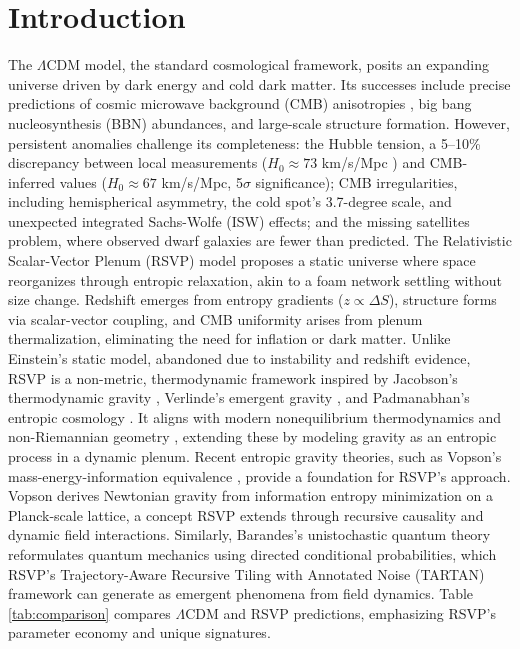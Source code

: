 \documentclass[11pt]{article}
\theoremstyle{plain}
\theoremstyle{definition}
\begin{document}
\section{Introduction}
The $\Lambda$CDM model, the standard cosmological framework, posits an expanding universe driven by dark energy and cold dark matter. Its successes include precise predictions of cosmic microwave background (CMB) anisotropies \citep{Planck2018}, big bang nucleosynthesis (BBN) abundances, and large-scale structure formation. However, persistent anomalies challenge its completeness: the Hubble tension, a 5--10\% discrepancy between local measurements ($H_0 \approx 73$ km/s/Mpc \citep{Riess2022}) and CMB-inferred values ($H_0 \approx 67$ km/s/Mpc, 5$\sigma$ significance); CMB irregularities, including hemispherical asymmetry, the cold spot's 3.7-degree scale, and unexpected integrated Sachs-Wolfe (ISW) effects; and the missing satellites problem, where observed dwarf galaxies are fewer than predicted.
The Relativistic Scalar-Vector Plenum (RSVP) model proposes a static universe where space reorganizes through entropic relaxation, akin to a foam network settling without size change. Redshift emerges from entropy gradients ($z \propto \Delta S$), structure forms via scalar-vector coupling, and CMB uniformity arises from plenum thermalization, eliminating the need for inflation or dark matter. Unlike Einstein's static model, abandoned due to instability and redshift evidence, RSVP is a non-metric, thermodynamic framework inspired by Jacobson's thermodynamic gravity \citep{Jacobson1995}, Verlinde's emergent gravity \citep{Verlinde2011}, and Padmanabhan's entropic cosmology \citep{Padmanabhan2015}. It aligns with modern nonequilibrium thermodynamics and non-Riemannian geometry \citep{Shao2023}, extending these by modeling gravity as an entropic process in a dynamic plenum.
Recent entropic gravity theories, such as Vopson's mass-energy-information equivalence \citep{Vopson2022}, provide a foundation for RSVP's approach. Vopson derives Newtonian gravity from information entropy minimization on a Planck-scale lattice, a concept RSVP extends through recursive causality and dynamic field interactions. Similarly, Barandes's unistochastic quantum theory \citep{Barandes2024} reformulates quantum mechanics using directed conditional probabilities, which RSVP's Trajectory-Aware Recursive Tiling with Annotated Noise (TARTAN) framework can generate as emergent phenomena from field dynamics.
Table \ref{tab:comparison} compares $\Lambda$CDM and RSVP predictions, emphasizing RSVP's parameter economy and unique signatures.
\end{document}
